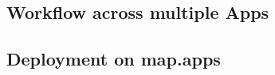 
\subsection{Workflow across multiple Apps}
\label{subsec:WorkflowMultipleApps}


\subsection{Deployment on map.apps}
\label{subsec:DeploymentMultipleApps}
